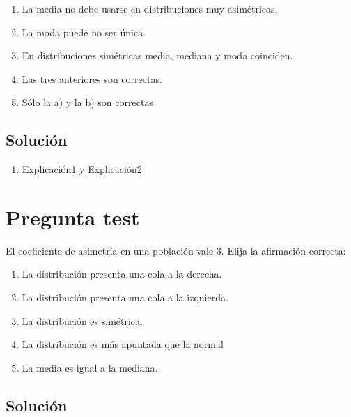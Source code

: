 \documentclass[
]{book}
\providecommand{\tightlist}{%
  \setlength{\itemsep}{0pt}\setlength{\parskip}{0pt}}
\begin{document}
\begin{enumerate}
\def\labelenumi{\alph{enumi})}
\tightlist
\item
  La media no debe usarse en distribuciones muy asimétricas.
\item
  La moda puede no ser única.
\item
  En distribuciones simétricas media, mediana y moda coinciden.
\item
  Las tres anteriores son correctas.
\item
  Sólo la a) y la b) son correctas
\end{enumerate}

\hypertarget{soluciuxf3n-51}{%
\subsection{Solución}\label{soluciuxf3n-51}}

\begin{enumerate}
\def\labelenumi{\alph{enumi})}
\setcounter{enumi}{4}
\tightlist
\item
  \href{https://1fjmanzano.github.io/bioestadistica/medidas-de-forma.html}{Explicación1} y \href{https://www.statisticshowto.com/what-is-a-bimodal-distribution/}{Explicación2}
\end{enumerate}

\hypertarget{pregunta-test-50}{%
\section{Pregunta test}\label{pregunta-test-50}}

El coeficiente de asimetría en una población vale 3. Elija la afirmación correcta:

\begin{enumerate}
\def\labelenumi{\alph{enumi})}
\tightlist
\item
  La distribución presenta una cola a la derecha.
\item
  La distribución presenta una cola a la izquierda.
\item
  La distribución es simétrica.
\item
  La distribución es más apuntada que la normal
\item
  La media es igual a la mediana.
\end{enumerate}

\hypertarget{soluciuxf3n-52}{%
\subsection{Solución}\label{soluciuxf3n-52}}
\end{document}
